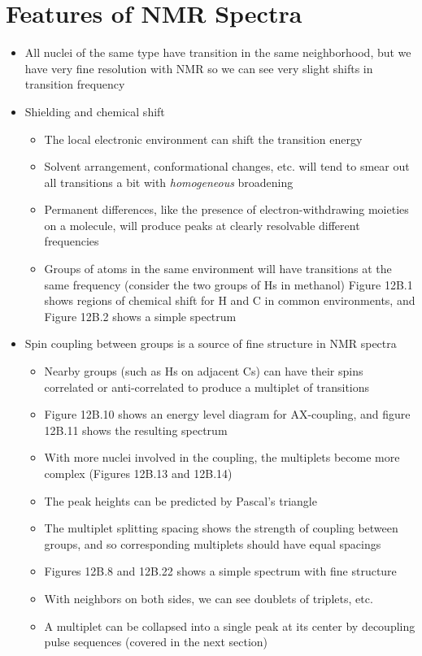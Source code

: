 \documentclass[12pt, openany, letterpaper]{memoir}
\begin{document}
\section{Features of NMR Spectra}
\begin{itemize}
	\item All nuclei of the same type have transition in the same neighborhood, but we have very fine resolution with NMR so we can see very slight shifts in transition frequency
	\item Shielding and chemical shift
	\begin{itemize}
		\item The local electronic environment can shift the transition energy
		\item Solvent arrangement, conformational changes, etc. will tend to smear out all transitions a bit with \emph{homogeneous} broadening
		\item Permanent differences, like the presence of electron-withdrawing moieties on a molecule, will produce peaks at clearly resolvable different frequencies
		\item Groups of atoms in the same environment will have transitions at the same frequency (consider the two groups of Hs in methanol)
		Figure 12B.1 shows regions of chemical shift for H and C in common environments, and Figure 12B.2 shows a simple spectrum
	\end{itemize}
	\item Spin coupling between groups is a source of fine structure in NMR spectra
	\begin{itemize}
		\item Nearby groups (such as Hs on adjacent Cs) can have their spins correlated or anti-correlated to produce a multiplet of transitions
		\item Figure 12B.10 shows an energy level diagram for AX-coupling, and figure 12B.11 shows the resulting spectrum
		\item With more nuclei involved in the coupling, the multiplets become more complex (Figures 12B.13 and 12B.14)
		\item The peak heights can be predicted by Pascal's triangle
		\item The multiplet splitting spacing shows the strength of coupling between groups, and so corresponding multiplets should have equal spacings
		\item Figures 12B.8 and 12B.22 shows a simple spectrum with fine structure
		\item With neighbors on both sides, we can see doublets of triplets, etc.
		\item A multiplet can be collapsed into a single peak at its center by decoupling pulse sequences (covered in the next section)
	\end{itemize}
	
\end{itemize}
\end{document}
